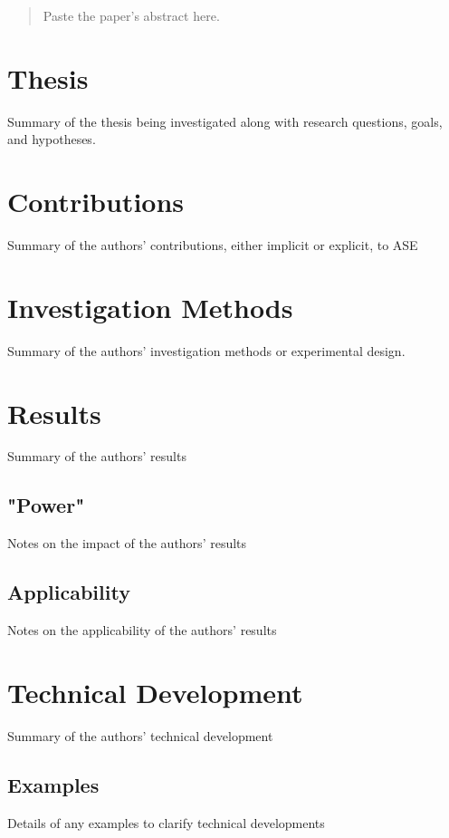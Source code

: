 \documentclass[12pt]{article}
\begin{document}
\maketitle

\begin{abstract}
Paste the paper's abstract here.
\end{abstract}

\section{Thesis}\label{thesis}
Summary of the thesis being investigated along with research questions, goals, and hypotheses.

\section{Contributions}\label{contrib}
Summary of the authors' contributions, either implicit or explicit, to ASE

\section{Investigation Methods}\label{invest}
Summary of the authors' investigation methods or experimental design.

\section{Results}\label{results}
Summary of the authors' results

\subsection{"Power"}\label{results-power}
Notes on the impact of the authors' results

\subsection{Applicability}\label{results-apply}
Notes on the applicability of the authors' results

\section{Technical Development}\label{tech}
Summary of the authors' technical development

\subsection{Examples}\label{tech-examples}
Details of any examples to clarify technical developments



\end{document}
